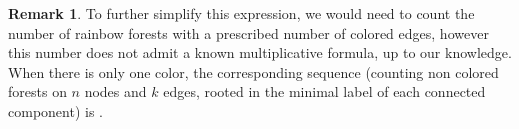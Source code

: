 \documentclass{amsart}
\theoremstyle{definition}
\newtheorem{remark}[theorem]{Remark}
\renewcommand{\b}[1]{{\boldsymbol{#1}}} %
\newcommand{\eqdef}{\mbox{\,\raisebox{0.2ex}{\scriptsize\ensuremath{\mathrm:}}\ensuremath{=}\,}} %
\newcommand{\resp}{resp.~} %
\newcommand{\OEIS}[1]{\cite[{\rm \href{http://oeis.org/#1}{\texttt{#1}}}]{OEIS}}
\renewcommand{\b}[1]{\boldsymbol{#1}} %
\begin{document}
%
%
%

\begin{remark}
To further simplify this expression, we would need to count the number of rainbow forests with a prescribed number of colored edges, however this number does not admit a  known multiplicative formula, up to our knowledge. When there is only one color, the corresponding sequence (counting non colored forests on $n$ nodes and $k$ edges, rooted in the minimal label of each connected component) is \OEIS{A138464}.
\end{remark}
\end{document}
